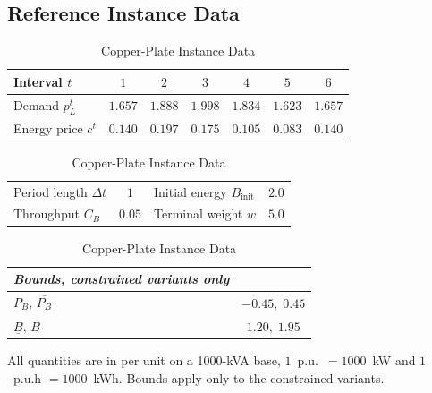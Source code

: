 \subsection{Reference Instance Data}

\begin{table}[H]
\centering
\caption{Copper-Plate Instance Data}
\label{tab:cp_data}
\setlength{\tabcolsep}{5pt}
\begin{tabular}{lcccccc}
\toprule
\textbf{Interval $t$} & $1$ & $2$ & $3$ & $4$ & $5$ & $6$ \\
\midrule
Demand $p_L^t$     & $1.657$ & $1.888$ & $1.998$ & $1.834$ & $1.623$ & $1.657$ \\
Energy price $c^t$ & $0.140$ & $0.197$ & $0.175$ & $0.105$ & $0.083$ & $0.140$ \\
\bottomrule
\end{tabular}

\smallskip

\renewcommand{\arraystretch}{1.15}
\begin{tabular}{lc@{\hskip 10pt}lc}
\toprule
Period length $\Delta t$ & $1$   & Initial energy $B_{\text{init}}$ & $2.0$ \\
Throughput $C_B$         & $0.05$ & Terminal weight $w$  & $5.0$ \\
\bottomrule
\end{tabular}

\smallskip

\renewcommand{\arraystretch}{1.25}
\begin{tabular}{lc}
\toprule
\textit{Bounds, constrained variants only} & \\
\midrule
$\underline{P_B},\,\overline{P_B}$ & $-0.45,\;0.45$ \\
$\underline B,\,\overline B$       & $1.20,\;1.95$ \\
\bottomrule
\end{tabular}

\smallskip

\raggedright
\footnotesize All quantities are in per unit on a 1000-kVA base, $1$~p.u.\ $=
1000$~kW and $1$~p.u.h $= 1000$~kWh. Bounds apply only to the constrained
variants.
\end{table}
